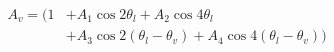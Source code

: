 \begin{align}
A_v=(1 &+ A_1\cos 2\theta_l + A_2\cos 4\theta_l \\
        &+ A_3\cos 2(\theta_l-\theta_v) + A_4\cos 4(\theta_l-\theta_v))
\end{align}
